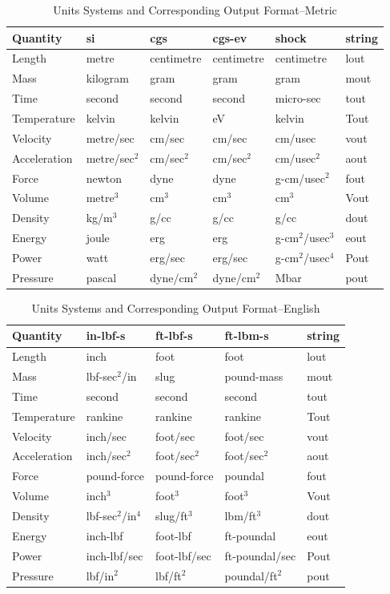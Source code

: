 \begin{longtable}{l|lllll}
\caption{Units Systems and Corresponding Output Format--Metric} \\
\hline
Quantity      &si&  cgs       & cgs-ev     & shock      & string \\
\hline
Length        & metre    & centimetre & centimetre & centimetre & lout \\
Mass          & kilogram & gram       & gram       & gram       & mout \\
Time          & second   & second     & second     & micro-sec  & tout \\
Temperature   & kelvin   & kelvin     & eV         & kelvin     & Tout \\
Velocity      & metre/sec& cm/sec     & cm/sec     & cm/usec    & vout \\
Acceleration  & metre/sec$^2$ & cm/sec$^2$ & cm/sec$^2$ & cm/usec$^2$ & aout \\
Force         & newton   & dyne       & dyne       & g-cm/usec$^2$ & fout \\
Volume        & metre$^3$ &  cm$^3$ & cm$^3$ & cm$^3$ & Vout \\
Density       & kg/m$^3$ &  g/cc & g/cc & g/cc & dout \\
Energy        & joule    & erg & erg & g-cm$^2$/usec$^3$ & eout \\
Power         & watt     & erg/sec & erg/sec & g-cm$^2$/usec$^4$ & Pout \\
Pressure      & pascal   & dyne/cm$^2$ & dyne/cm$^2$ & Mbar & pout \\
\hline
\end{longtable}


\begin{longtable}{l|llll}
\caption{Units Systems and Corresponding Output Format--English} \\
\hline
Quantity & in-lbf-s & ft-lbf-s & ft-lbm-s & string \\
\hline
Length       & inch         & foot & foot & lout \\
Mass         & lbf-sec$^2$/in & slug & pound-mass & mout \\
Time         & second & second & second & tout \\
Temperature  & rankine & rankine & rankine & Tout \\
Velocity     & inch/sec & foot/sec & foot/sec & vout \\
Acceleration & inch/sec$^2$ & foot/sec$^2$ & foot/sec$^2$ & aout \\
Force        & pound-force & pound-force & poundal & fout \\
Volume       & inch$^3$ & foot$^3$ & foot$^3$ & Vout \\
Density      & lbf-sec$^2$/in$^4$ & slug/ft$^3$ & lbm/ft$^3$ & dout \\
Energy       & inch-lbf & foot-lbf & ft-poundal & eout \\
Power        & inch-lbf/sec & foot-lbf/sec & ft-poundal/sec & Pout\\
Pressure     & lbf/in$^2$ & lbf/ft$^2$ & poundal/ft$^2$ & pout \\
\hline
\end{longtable}


